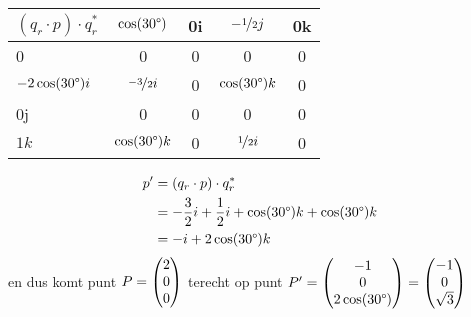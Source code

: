 \begin{enumerate}
	\begin{NiceTabular}{ | a | c | c | c | c |}
		\hline
         \RowStyle{\color{white}} %
		$ (q_r\cdot p)\cdot q^*_r $ & $\cos(30 \degree)$  & 0i  & $-\nicefrac{1}{2}j$   & 0k \\   & 0 & 0 &   0    & 0  \\ \hline
		$ -2\cos(30 \degree)i  $   & $ \nicefrac{-3}{2} i  $ & 0 &   $ \cos(30 	\degree)k $    & 0 \\ \hline
		0j   & 0 &  0  &   0     & 0\\ \hline
		$1k$ &  $ \cos(30 \degree) k $     & 0 & $\nicefrac{1}{2}i$      & 0 \\ 
		\hline 
	\end{NiceTabular}
    \begin{align*}
        p' &= (q_r\cdot p)\cdot q^*_r  \\
           &= -\frac{3}{2}i + \frac{1}{2}i + \cos(30 \degree)  k + \cos(30 \degree)  k \\
           &= -i + 2\cos(30 \degree)  k 
    \end{align*}
	en dus komt  punt $ P= \begin{pmatrix} 2 \\ 0 \\ 0 \end{pmatrix} $  terecht op punt $ P'= \begin{pmatrix} -1 \\ 0 \\ 2\cos(30 \degree) \end{pmatrix} = \begin{pmatrix} -1 \\ 0 \\ \sqrt{3} \end{pmatrix}$ 
	
\end{enumerate}

